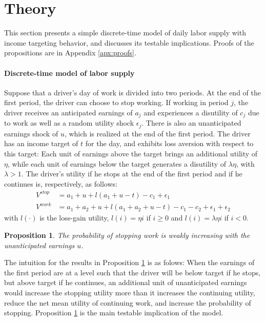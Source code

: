 \documentclass[reviewmode]{restat}
\newtheorem{proposition}{Proposition}
\begin{document}
\section{Theory}
\label{sec:theory}

This section presents a simple discrete-time model of daily labor supply with income targeting behavior,
and discusses its testable implications.  Proofs of the propositions are in Appendix \ref{apx:proofs}.

\paragraph{Discrete-time model of labor supply} Suppose that a driver's day of work is divided into two periods.
At the end of the first period, the driver can choose to stop working. If working in period $j$, the driver
receives an anticipated earnings of $a_j$ and experiences a disutility of $c_j$ due to work as well as a
random utility shock $\epsilon_j$. There is also an unanticipated earnings shock of $u$, which is realized 
at the end of the first period. The driver has an income target of $t$ for the day, and exhibits loss 
aversion with respect to this target: Each unit of earnings above the target brings an additional utility
of $\eta$, while each unit of earnings below the target generates a disutility of $\lambda\eta$, 
with $\lambda > 1$. The driver's utility if he stops at the end of the first period and if he continues is, 
respectively, as follows:
\begin{align*}
V^{stop} &= a_1 + u + l(a_1+u-t) - c_1 + \epsilon_1 \\
V^{work} &= a_1 + a_2 + u + l(a_1+a_2+u-t) - c_1 - c_2 + \epsilon_1 + \epsilon_2   
\end{align*}
with $l(\cdot)$ is the loss-gain utility, $l(i) = \eta i$ if $i\geq0$ and $l(i) = \lambda\eta i$ if $i<0$. 
\begin{proposition}
\label{prop:unanticipated}
The probability of stopping work is weakly increasing with the unanticipated earnings $u$.
\end{proposition}


The intuition for the results in Proposition \ref{prop:unanticipated} is as folows: When the earnings of 
the first period are at a level such that the driver will be below target if he stops, but above target if
he continues, an additional unit of unanticipated earnings would increase the stopping utility more than it
increases the continuing utility, reduce the net mean utility of continuing work, and increase the
probability of stopping. Proposition \ref{prop:unanticipated} is the main testable implication of the model.
\end{document}
